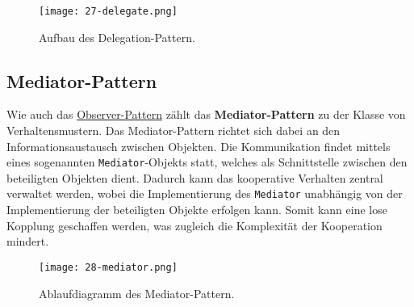 \begin{figure}[H]
    \texttt{[image: 27-delegate.png]}
    \caption{Aufbau des Delegation-Pattern.}\label{fig:delegation}
\end{figure}


\subsection{Mediator-Pattern}

Wie auch das \hyperref[sub:observer]{Observer-Pattern} zählt das \textbf{Mediator-Pattern} zu der Klasse von Verhaltensmustern. Das Mediator-Pattern richtet sich dabei an den Informationsaustausch zwischen Objekten. Die Kommunikation findet mittels eines sogenannten \texttt{Mediator}-Objekts statt, welches als Schnittstelle zwischen den beteiligten Objekten dient. Dadurch kann das kooperative Verhalten zentral verwaltet werden, wobei die Implementierung des \texttt{Mediator} unabhängig von der Implementierung der beteiligten Objekte erfolgen kann. Somit kann eine lose Kopplung geschaffen werden, was zugleich die Komplexität der Kooperation mindert. 

\begin{figure}[H]
    \texttt{[image: 28-mediator.png]}
    \caption{Ablaufdiagramm des Mediator-Pattern.}\label{fig:mediator}
\end{figure}
